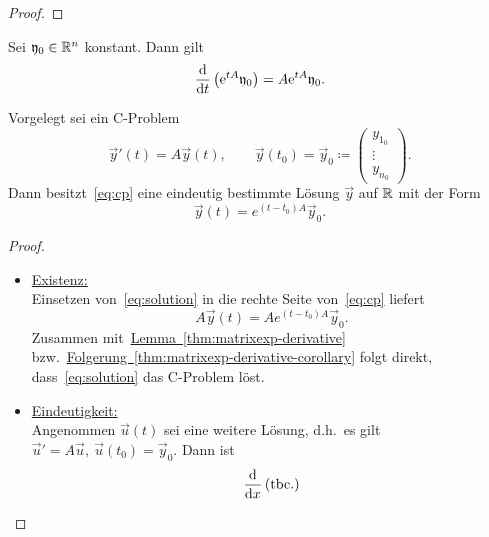 \begin{proof}
\end{proof}

\begin{corollary}\label{thm:matrixexp-derivative-corollary}
    Sei $\mathfrak{y}_0 \in \mathbb{R}^n$ konstant.
    Dann gilt
    \begin{equation*}
        \frac{\mathrm{d} }{\mathrm{d} t} \left( \mathrm{e}^{t A} \mathfrak{y}_0 \right) = A \mathrm{e}^{t A} \mathfrak{y}_0.
    \end{equation*}
\end{corollary}

\begin{theorem}\label{thm:existenz-eindeutigkeit}
    Vorgelegt sei ein C-Problem
    \begin{equation}\tag{CP}\label{eq:cp}
        \vec{y}'(t) = A \vec{y}(t), \qquad \vec{y}(t_0) = \vec{y}_0 \coloneqq \begin{pmatrix} y_{1_0}\\ \vdots\\ y_{n_0} \end{pmatrix}.
    \end{equation}
    Dann besitzt~\eqref{eq:cp} eine eindeutig bestimmte Lösung $\vec{y}$ auf $\mathbb{R}$ mit der Form
    \begin{equation}\tag{$\ast$}\label{eq:solution}
        \vec{y}(t) = e^{(t - t_0) A} \vec{y}_0.
    \end{equation}
\end{theorem}

\begin{proof}
    \begin{itemize}
        \item   \underline{Existenz:}\\
                Einsetzen von~\eqref{eq:solution} in die rechte Seite von~\eqref{eq:cp} liefert
                \begin{equation*}
                    A \vec{y}(t) = A e^{(t - t_0) A} \vec{y}_0.
                \end{equation*}
                Zusammen mit~\hyperref[thm:matrixexp-derivative]{Lemma~\ref*{thm:matrixexp-derivative}}
                bzw.~\hyperref[thm:matrixexp-derivative-corollary]{Folgerung~\ref*{thm:matrixexp-derivative-corollary}}
                folgt direkt, dass~\eqref{eq:solution} das C-Problem löst.

        \item   \underline{Eindeutigkeit:}\\
                Angenommen $\vec{u}(t)$ sei eine weitere Lösung, d.h.~es gilt $\vec{u}' = A \vec{u},\ \vec{u}(t_0) = \vec{y}_0$.
                Dann ist
                \begin{align*}
                    \frac{\mathrm{d} }{\mathrm{d} x} \left( \text{tbc.} \right)
                \end{align*}
    \end{itemize}
\end{proof}